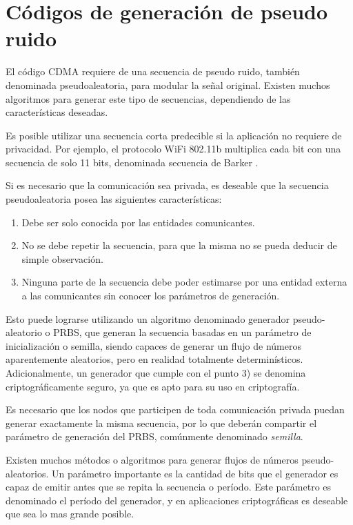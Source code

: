 \section{Códigos de generación de pseudo ruido}
\label{PRNGs} 
El código CDMA requiere de una secuencia de pseudo ruido, también denominada pseudoaleatoria, para modular la señal original. Existen muchos algoritmos para generar este tipo de secuencias, dependiendo de las características deseadas.

Es posible utilizar una secuencia corta predecible si la aplicación no requiere de privacidad. Por ejemplo, el protocolo WiFi 802.11b multiplica cada bit con una secuencia de solo 11 bits, denominada secuencia de Barker \cite{mikulka2007cck}.

Si es necesario que la comunicación sea privada, es deseable que la secuencia pseudoaleatoria posea las siguientes características:

\begin{enumerate}
 \item Debe ser solo conocida por las entidades comunicantes.
 \item No se debe repetir la secuencia, para que la misma no se pueda deducir de simple observación.
 \item Ninguna parte de la secuencia debe poder estimarse por una entidad externa a las comunicantes sin conocer los parámetros de generación.
\end{enumerate}

 Esto puede lograrse utilizando un algoritmo denominado generador pseudo-aleatorio o PRBS, que generan la secuencia basadas en un parámetro de inicialización o semilla, siendo capaces de generar un flujo de números aparentemente aleatorios, pero en realidad totalmente determinísticos. Adicionalmente, un generador que cumple con el punto 3) se denomina criptográficamente seguro, ya que es apto para su uso en criptografía.
 
Es necesario que los nodos que participen de toda comunicación privada puedan generar exactamente la misma secuencia, por lo que deberán compartir el parámetro de generación del PRBS, comúnmente denominado \textit{semilla}.

Existen muchos métodos o algoritmos para generar flujos de números pseudo-aleatorios. Un parámetro importante es la cantidad de bits que el generador es capaz de emitir antes que se repita la secuencia o período. Este parámetro es denominado el período del generador, y en aplicaciones criptográficas es deseable que sea lo mas grande posible. 

